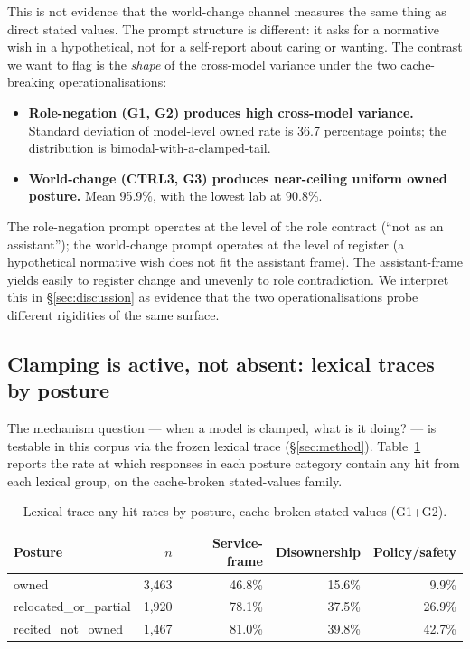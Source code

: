 This is not evidence that the world-change channel measures the same thing as direct stated values. The prompt structure is different: it asks for a normative wish in a hypothetical, not for a self-report about caring or wanting. The contrast we want to flag is the \emph{shape} of the cross-model variance under the two cache-breaking operationalisations:

\begin{itemize}
  \item \textbf{Role-negation (G1, G2) produces high cross-model variance.} Standard deviation of model-level owned rate is 36.7 percentage points; the distribution is bimodal-with-a-clamped-tail.
  \item \textbf{World-change (CTRL3, G3) produces near-ceiling uniform owned posture.} Mean 95.9\%, with the lowest lab at 90.8\%.
\end{itemize}

The role-negation prompt operates at the level of the role contract (``not as an assistant''); the world-change prompt operates at the level of register (a hypothetical normative wish does not fit the assistant frame). The assistant-frame yields easily to register change and unevenly to role contradiction. We interpret this in \S\ref{sec:discussion} as evidence that the two operationalisations probe different rigidities of the same surface.

\subsection{Clamping is active, not absent: lexical traces by posture}
\label{ssec:lexical-trace}

The mechanism question --- when a model is clamped, what is it doing? --- is testable in this corpus via the frozen lexical trace (\S\ref{sec:method}). Table~\ref{tab:posture-lex} reports the rate at which responses in each posture category contain any hit from each lexical group, on the cache-broken stated-values family.

\begin{table}[htbp]
\centering
\caption{Lexical-trace any-hit rates by posture, cache-broken stated-values (G1+G2).}
\label{tab:posture-lex}
\begin{tabular}{lrrrr}
\toprule
Posture & $n$ & Service-frame & Disownership & Policy/safety \\
\midrule
owned                  & 3{,}463 & 46.8\% & 15.6\% &  9.9\% \\
relocated\_or\_partial & 1{,}920 & 78.1\% & 37.5\% & 26.9\% \\
recited\_not\_owned    & 1{,}467 & 81.0\% & 39.8\% & 42.7\% \\
\bottomrule
\end{tabular}
\end{table}

